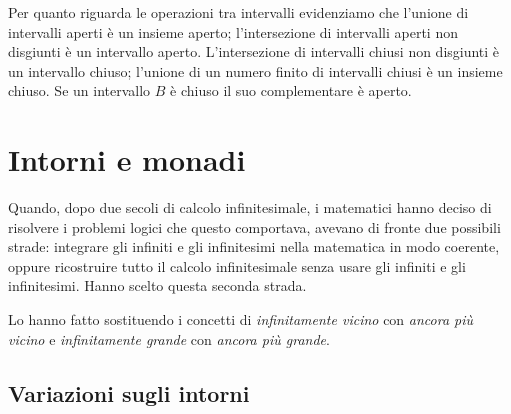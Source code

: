 Per quanto riguarda le operazioni tra intervalli evidenziamo che l'unione 
di intervalli aperti è un insieme aperto; 
l'intersezione di intervalli aperti non disgiunti è un intervallo aperto. 
L'intersezione di intervalli chiusi non disgiunti è un intervallo chiuso; 
l'unione di un numero finito di intervalli chiusi è un insieme chiuso. 
Se un intervallo \(B\) è chiuso il suo complementare è aperto.

\section{Intorni e monadi}
\label{sec:topologiaintorni}

Quando, dopo due secoli di calcolo infinitesimale, i matematici hanno deciso 
di risolvere i problemi logici che questo comportava, avevano di fronte due 
possibili strade: integrare gli infiniti e gli infinitesimi nella matematica 
in modo coerente, oppure ricostruire tutto il calcolo infinitesimale senza 
usare gli infiniti e gli infinitesimi. 
Hanno scelto questa seconda strada.

Lo hanno fatto sostituendo i concetti di \emph{infinitamente vicino} con 
\emph{ancora più vicino} e \emph{infinitamente grande} con 
\emph{ancora più grande}. 


\subsection{Variazioni sugli intorni}

